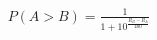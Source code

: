 \documentclass[preview]{standalone}
\begin{document}
\begin{align*}
P(A > B) = \frac{1}{1 + 10^{\frac{R_B - R_A}{400}}}
\end{align*}
\end{document}
